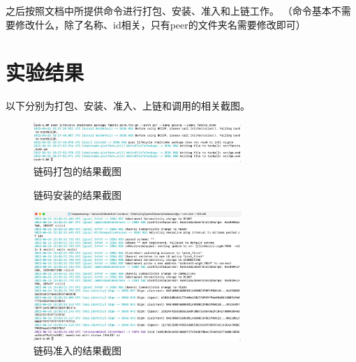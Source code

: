 \documentclass{article}
\begin{document}
    之后按照文档中所提供命令进行打包、安装、准入和上链工作。
    （命令基本不需要修改什么，除了名称、id相关，只有peer的文件夹名需要修改即可）
    \section{实验结果}
    以下分别为打包、安装、准入、上链和调用的相关截图。
    \begin{figure}[H]
        \centering
        \includegraphics[width=0.7\textwidth]{./figs/archive.jpg}
        \caption{链码打包的结果截图}
    \end{figure}
    \begin{figure}[H]
        \centering
        \caption{链码安装的结果截图}
    \end{figure}
    \begin{figure}[H]
        \centering
        \includegraphics[width=0.7\textwidth]{./figs/准入.jpg}
        \caption{链码准入的结果截图}
    \end{figure}
\end{document}
